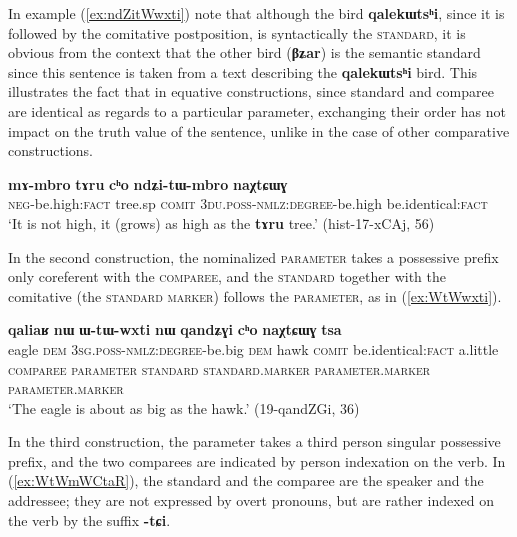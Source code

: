 \documentclass[oneside,a4paper,11pt]{article}
\newcommand{\ipa}[1]{{\phon\textbf{#1}}} %
\begin{document}
In example (\ref{ex:ndZitWwxti}) note that although the bird \ipa{qalekɯtsʰi}, since it is followed by the comitative postposition, is syntactically the \textsc{standard}, it is obvious from the context that the other bird (\ipa{βʑar}) is the semantic standard since this sentence is taken from a text describing the \ipa{qalekɯtsʰi} bird. This illustrates the fact that in equative constructions, since standard and comparee are identical as regards to a particular parameter, exchanging their order has not impact on the truth value of the sentence, unlike in the case of other comparative constructions.

\begin{exe}
\ex \label{ex:ndZitWmbro}
\gll 
\ipa{mɤ-mbro} 	\ipa{tɤru} 	\ipa{cʰo} 	\ipa{ndʑi-tɯ-mbro} 	\ipa{naχtɕɯɣ} \\
\textsc{neg}-be.high:\textsc{fact} tree.sp \textsc{comit} \textsc{3du.poss-nmlz:degree}-be.high be.identical:\textsc{fact} \\
\glt `It is not high, it (grows) as high as the \ipa{tɤru} tree.' (hist-17-xCAj, 56)
\end{exe}

In the second construction, the nominalized \textsc{parameter} takes a possessive prefix only coreferent with the \textsc{comparee}, and the \textsc{standard}  together with the comitative (the \textsc{standard marker}) follows the \textsc{parameter}, as in (\ref{ex:WtWwxti}).

\begin{exe}
\ex \label{ex:WtWwxti}
\glll
\ipa{qaliaʁ} 	\ipa{nɯ} 	\ipa{ɯ-tɯ-wxti} 	\ipa{nɯ} 	\ipa{qandʑɣi} 	\ipa{cʰo} 	\ipa{naχtɕɯɣ} 	\ipa{tsa} 	\\
eagle \textsc{dem} \textsc{3sg.poss-nmlz:degree}-be.big \textsc{dem} hawk \textsc{comit} be.identical:\textsc{fact} a.little  \\
{\textsc{comparee}} { } \textsc{parameter} { } {\textsc{standard}} \textsc{standard.marker} \textsc{parameter.marker}  \textsc{parameter.marker} \\
\glt `The eagle is about as big as the hawk.' (19-qandZGi, 36)
\end{exe}

In the third construction, the parameter takes a third person singular possessive prefix, and the two comparees are indicated by person indexation on the verb. In (\ref{ex:WtWmWCtaR}), the standard and the comparee are the speaker and the addressee; they are not expressed by overt pronouns, but are rather indexed on the verb by the suffix \ipa{-tɕi}.
\end{document}
